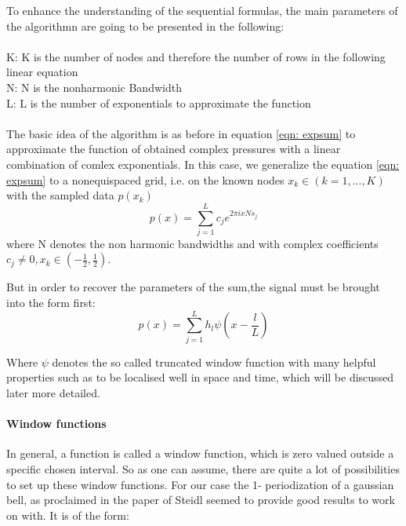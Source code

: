 \documentclass{article}
\begin{document}
To enhance the understanding of the sequential formulas, the main parameters of the algorithmn are going to be presented in the following:
\\\\
 K: K is the number of nodes and therefore the number of rows in the following linear equation\\
 N: N is the nonharmonic Bandwidth\\
 L: L is the number of exponentials to approximate the function
\\\\
The basic idea of the algorithm is as before in equation \eqref{eqn: expsum} to approximate the function of obtained complex pressures with a linear combination of comlex exponentials.
In this case, we generalize the equation \eqref{eqn: expsum} to a nonequispaced grid, i.e. on the known nodes $x_{k}\in (k=1,...,K)$ with the sampled data  $p(x_{k}) $
\\
\begin{equation}
 p(x)=\sum\limits_{j=1}^L c_{j}e^{2\pi ixNs_{j}}
\end{equation}
where N denotes the non harmonic bandwidths and with complex coefficients $c_{j}\neq0, x_{k} \in (-\frac{1}{2},\frac{1}{2})$.

But in order to recover the parameters of the sum,the signal must be brought into the form first:  
\begin{equation}\label{eqn:truncatedw}
 p(x)=\sum\limits_{j=1}^L h_{l}\psi(x-\frac{l}{L})
\end{equation}

Where $\psi$ denotes the so called truncated window function with many helpful properties such as to be localised well in space and time, which will be discussed later more detailed. \\

\paragraph{Window functions	} $ $\\[1ex]
In general, a function is called a window function, which is zero valued outside a specific chosen interval.
So as one can assume, there are quite a lot of possibilities to set up these window functions.
For our case the 1- periodization of a gaussian bell, as proclaimed in the paper of Steidl seemed to provide good results to work on with.
It is of the form: 
\end{document}
